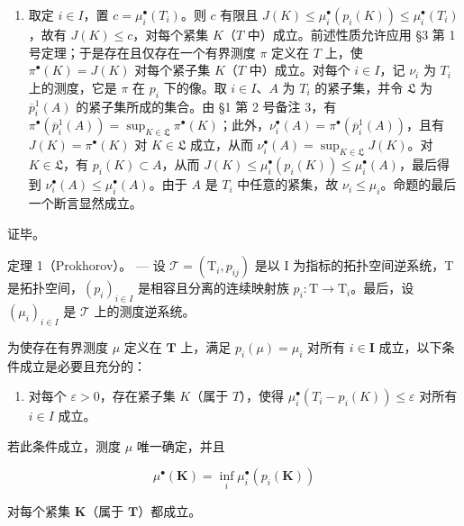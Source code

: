 \begin{enumerate}
\def\labelenumi{\arabic{enumi})}
\setcounter{enumi}{4}
\tightlist
\item
  取定 \(i \in I\)，置 \(c = \mu_i^\bullet(T_i)\)。则 \(c\) 有限且 \(J(K) \leqslant \mu_i^\bullet(p_i(K)) \leqslant \mu_i^\bullet(T_i)\)，故有 \(J(K) \leqslant c\)，对每个紧集 \(K\)（\(T\) 中）成立。前述性质允许应用 §3 第 1 号定理；于是存在且仅存在一个有界测度 \(\pi\) 定义在 \(T\) 上，使 \(\pi^\bullet(K) = J(K)\) 对每个紧子集 \(K\)（\(T\) 中）成立。对每个 \(i \in I\)，记 \(\nu_i\) 为 \(T_i\) 上的测度，它是 \(\pi\) 在 \(p_i\) 下的像。取 \(i \in I\)、\(A\) 为 \(T_i\) 的紧子集，并令 \(\mathfrak{L}\) 为 \(\overline{p}_i^1(A)\) 的紧子集所成的集合。由 §1 第 2 号备注 3，有 \(\pi^\bullet(\overline{p}_i^1(A)) = \sup_{K \in \mathfrak{L}} \pi^\bullet(K)\)；此外，\(\nu_i^\bullet(A) = \pi^\bullet(\overline{p}_i^1(A))\)，且有 \(J(K) = \pi^\bullet(K)\) 对 \(K \in \mathfrak{L}\) 成立，从而 \(\nu_i^\bullet(A) = \sup_{K \in \mathfrak{L}} J(K)\)。对 \(K \in \mathfrak{L}\)，有 \(p_i(K) \subset A\)，从而 \(J(K) \leqslant \mu_i^\bullet(p_i(K)) \leqslant \mu_i^\bullet(A)\)，最后得到 \(\nu_i^\bullet(A) \leqslant \mu_i^\bullet(A)\)。由于 \(A\) 是 \(T_i\) 中任意的紧集，故 \(\nu_i \leqslant \mu_i\)。命题的最后一个断言显然成立。
\end{enumerate}

证毕。

定理 1（Prokhorov）。 --- 设 \(\mathcal{T} = (\mathrm{T}_{i}, p_{ij})\) 是以 I 为指标的拓扑空间逆系统，T 是拓扑空间，\((p_{i})_{i \in I}\) 是相容且分离的连续映射族 \(p_{i}: \mathrm{T} \to \mathrm{T}_{i}\)。最后，设 \((\mu_{i})_{i \in I}\) 是 \(\mathcal{T}\) 上的测度逆系统。

为使存在有界测度 \(\mu\) 定义在 \(\mathbf{T}\) 上，满足 \(p_i(\mu) = \mu_i\) 对所有 \(i \in \mathbf{I}\) 成立，以下条件成立是必要且充分的：

\begin{enumerate}
\def\labelenumi{(\Alph{enumi})}
\setcounter{enumi}{15}
\tightlist
\item
  对每个 \(\varepsilon > 0\)，存在紧子集 \(K\)（属于 \(T\)），使得 \(\mu_i^\bullet(T_i - p_i(K)) \leqslant \varepsilon\) 对所有 \(i \in I\) 成立。
\end{enumerate}

若此条件成立，测度 \(\mu\) 唯一确定，并且

\[
\mu^ {\bullet} (\mathbf {K}) = \inf _ {i} \mu_ {i} ^ {\bullet} (p _ {i} (\mathbf {K}))\tag{2}
\]

对每个紧集 \(\mathbf{K}\)（属于 \(\mathbf{T}\)）都成立。

